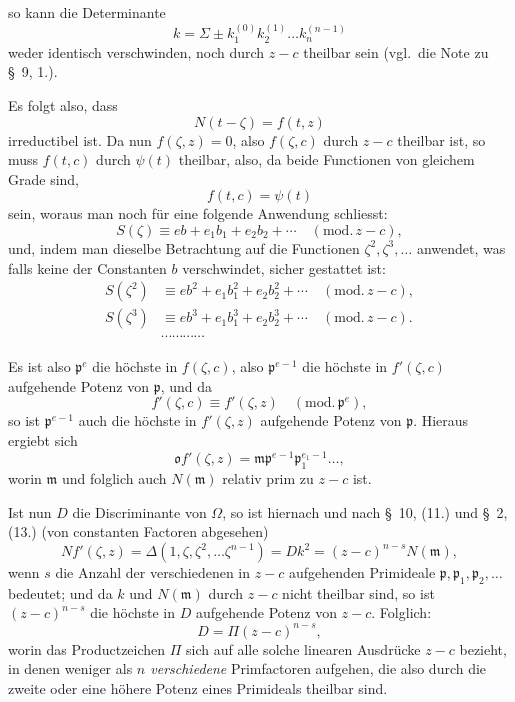 \documentclass{article}
\begin{document}
so kann die Determinante
\[ k = \Sigma \pm k_{1}^{(0)}k_{2}^{(1)}\ldots k_{n}^{(n-1)} \]
weder identisch verschwinden, noch durch $z-c$ theilbar sein (vgl.\ die Note zu §~9, 1.).


Es folgt also, dass
\[ N(t-\zeta) = f(t, z) \]
irreductibel ist. Da nun $f(\zeta, z) = 0$, also $f(\zeta, c)$ durch $z-c$ theilbar ist, so muss $f(t, c)$ durch $\psi(t)$ theilbar, also, da beide Functionen von gleichem Grade sind,
\[ f(t, c) = \psi(t) \]
sein, woraus man noch für eine folgende Anwendung schliesst:
\[ S(\zeta) \equiv eb + e_{1}b_{1} + e_{2}b_{2} + \cdots \quad (\text{mod.}\,z-c), \]
und, indem man dieselbe Betrachtung auf die Functionen $\zeta^{2}, \zeta^{3}, \ldots$ anwendet, was falls keine der Constanten $b$ verschwindet, sicher gestattet ist:
\[ \begin{aligned} S(\zeta^{2}) &\equiv eb^{2} + e_{1}b_{1}^{2} + e_{2}b_{2}^{2} + \cdots \quad (\text{mod.}\,z-c), \\ S(\zeta^{3}) &\equiv eb^{3} + e_{1}b_{1}^{3} + e_{2}b_{2}^{3} + \cdots \quad (\text{mod.}\,z-c). \\ &\cdots\cdots\cdots\cdots \end{aligned} \]

Es ist also $\mathfrak{p}^{e}$ die höchste in $f(\zeta, c)$, also $\mathfrak{p}^{e-1}$ die höchste in $f'(\zeta, c)$ aufgehende Potenz von $\mathfrak{p}$, und da
\[ f'(\zeta, c) \equiv f'(\zeta, z) \quad (\text{mod.}\,\mathfrak{p}^{e}), \]
so ist $\mathfrak{p}^{e-1}$ auch die höchste in $f'(\zeta, z)$ aufgehende Potenz von $\mathfrak{p}$. Hieraus ergiebt sich
\[ \mathfrak{o}f'(\zeta, z) = \mathfrak{m}\mathfrak{p}^{e-1}\mathfrak{p}_{1}^{e_{1}-1}\ldots, \]
worin $\mathfrak{m}$ und folglich auch $N(\mathfrak{m})$ relativ prim zu $z-c$ ist.

Ist nun $D$ die Discriminante von $\Omega$, so ist hiernach und nach §~10, (11.) und §~2, (13.) (von constanten Factoren abgesehen)
\[ Nf'(\zeta, z) = \Delta(1, \zeta, \zeta^{2}, \ldots \zeta^{n-1}) = Dk^{2} = (z-c)^{n-s}N(\mathfrak{m}), \]
wenn $s$ die Anzahl der verschiedenen in $z-c$ aufgehenden Primideale $\mathfrak{p}, \mathfrak{p}_{1}, \mathfrak{p}_{2}, \ldots$ bedeutet; und da $k$ und $N(\mathfrak{m})$ durch $z-c$ nicht theilbar sind, so ist $(z-c)^{n-s}$ die höchste in $D$ aufgehende Potenz von $z-c$. Folglich:
\[ D = \Pi(z-c)^{n-s}, \tag{1.} \]
worin das Productzeichen $\Pi$ sich auf alle solche linearen Ausdrücke $z-c$ bezieht, in denen weniger als \emph{$n$ verschiedene} Primfactoren aufgehen, die also durch die zweite oder eine höhere Potenz eines Primideals theilbar sind.
\end{document}
